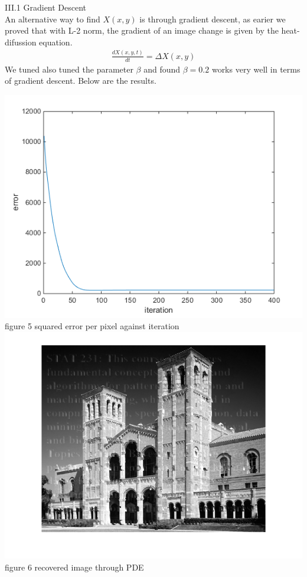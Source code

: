 \documentclass[12pt]{article}
\newenvironment{problem}[2][Part]{\begin{trivlist}
\item[\hskip \labelsep {\bfseries #1}\hskip \labelsep {\bfseries #2}]}{\end{trivlist}}
\begin{document}
\begin{problem}{III PDE}
\item{III.1 Gradient Descent\\}
An alternative way to find $X(x,y)$ is through gradient descent, as earier we proved that with L-2 norm, the gradient of an image change is given by the heat-difussion equation.
\begin{align*}
	\frac{dX(x,y,t)}{dt} = \Delta X(x,y)
\end{align*}
We tuned also tuned the parameter $\beta$ and found $\beta = 0.2$ works very well in terms of gradient descent. Below are the results.
\begin{center}
	\includegraphics[width=14cm]{results/error_heat_diffusion.png}{\\figure 5 squared error per pixel against iteration}
	\includegraphics[width=14cm]{results/recover_heat_diffusion.png}{\\figure 6 recovered image through PDE}
\end{center}


\end{problem}
\end{document}
